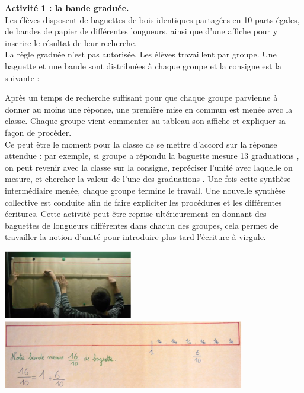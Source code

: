 \begin{exercice*}
   \bigskip
   {\bf Activité 1 : la bande graduée.} \\
   Les élèves disposent de baguettes de bois identiques partagées en 10 parts égales, de bandes de papier de différentes longueurs, ainsi que d’une affiche pour y inscrire le résultat de leur recherche. \\
La règle graduée n’est pas autorisée. Les élèves travaillent par groupe. Une baguette et une bande sont distribuées à chaque groupe et la consigne est la suivante :
\begin{center}
\end{center}
Après un temps de recherche suffisant pour que chaque groupe parvienne à donner au moins une réponse, une première mise en commun est menée avec la classe. Chaque groupe vient commenter au tableau son affiche et expliquer sa façon de procéder. \\
Ce peut être le moment pour la classe de se mettre d’accord sur la réponse attendue : par exemple, si groupe a répondu \og la baguette mesure 13 graduations \fg, on peut revenir avec la classe sur la consigne, repréciser l’unité avec laquelle on mesure, et chercher la valeur de l’une des \og graduations \fg.
Une fois cette synthèse intermédiaire menée, chaque groupe termine le travail. Une nouvelle synthèse collective est conduite afin de faire expliciter les procédures et les différentes écritures. Cette activité peut être reprise ultérieurement en donnant des baguettes de longueurs différentes dans chacun des groupes, cela permet de travailler la notion d’unité pour introduire plus tard l’écriture à virgule.
  \begin{center}
      \includegraphics[height=3cm]{Nombres_et_calculs_did/Images/Num4_analyse_bandes_A0}\;\includegraphics[height=3cm]{Nombres_et_calculs_did/Images/Num4_activites_bandes_A1}
   \end{center}
   

\end{exercice*}
